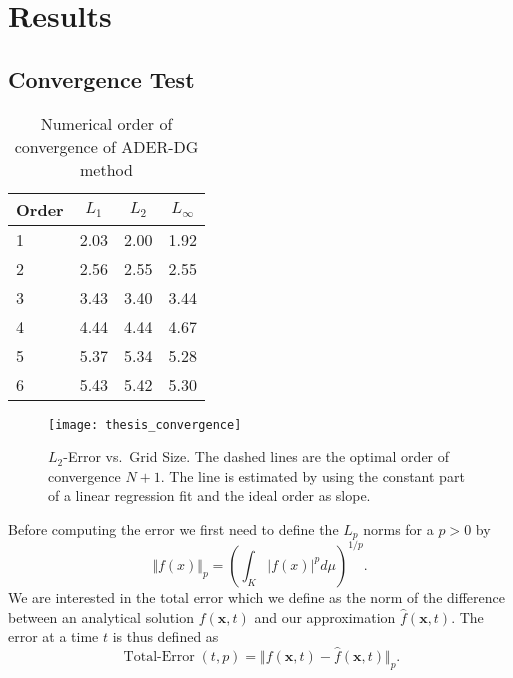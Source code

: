 \chapter{Results}\label{chap:results}
\section{Convergence Test}
\begin{table}[htb]
  \centering
\caption{Numerical order of convergence of ADER-DG method}%
\label{tab:convergence-order}
\begin{tabular}{@{}lS[table-format=1.2]S[table-format=1.2]S[table-format=1.2]@{}}
\toprule
{Order} & {$L_1$} & {$L_2$} & {$L_\infty$}\\  & 2.03 & 2.00 & 1.92\\
2 & 2.56 & 2.55 & 2.55\\
3 & 3.43 & 3.40 & 3.44\\
4 & 4.44 & 4.44 & 4.67\\
5 & 5.37 & 5.34 & 5.28\\
6 & 5.43 & 5.42 & 5.30\\
\bottomrule
\end{tabular}
\end{table}

\begin{figure}[htb]
  \centering
  \texttt{[image: thesis\_convergence]}
  \caption{$L_2$-Error vs.\ Grid Size.
    The dashed lines are the optimal order of convergence $N+1$.
  The line is estimated by using the constant part of a linear regression fit and the ideal order as slope.}
  \label{fig:convergence-l2-error}
\end{figure}

\newcommand{\error}{\operatorname{Total-Error}}

Before computing the error we first need to define the $L_p$ norms for a $p > 0$ by
\begin{equation}
  \label{eq:Lp-nrom}
  \Vert f(x) \Vert_p = \left( \int_K \vert f(x) \vert^p d\mu  \right)^{1/p}.
\end{equation}
We are interested in the total error which we define as the norm of the difference between an analytical solution $f(\bm{x}, t)$ and our approximation $\hat{f}(\bm{x}, t)$.
The error at a time $t$ is thus defined as
\begin{equation}
  \label{eq:error}
  \error(t,p) = \Vert f(\bm{x}, t) - \hat{f}(\bm{x}, t) \Vert_p.
\end{equation}

